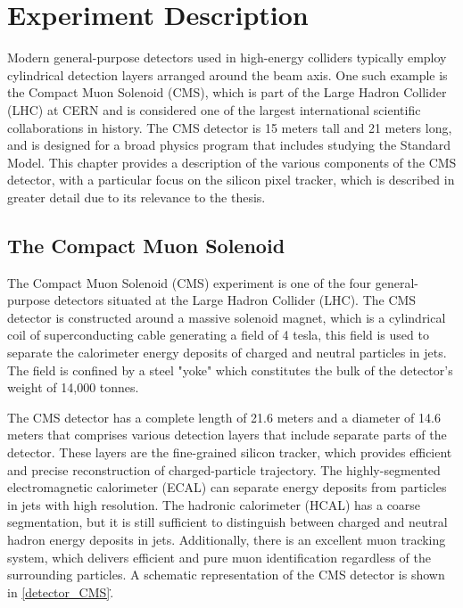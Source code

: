 \chapter{Experiment Description }

Modern general-purpose detectors used in high-energy colliders typically employ cylindrical detection layers arranged around the beam axis. One such example is the Compact Muon Solenoid (CMS), which is part of the Large Hadron Collider (LHC) at CERN and is considered one of the largest international scientific collaborations in history. The CMS detector is 15 meters tall and 21 meters long, and is designed for a broad physics program that includes studying the Standard Model. This chapter provides a description of the various components of the CMS detector, with a particular focus on the silicon pixel tracker, which is described in greater detail due to its relevance to the thesis.
 

\section{The Compact Muon Solenoid}

The Compact Muon Solenoid (CMS) experiment is one of the four general-purpose detectors situated at the Large Hadron Collider (LHC). The CMS detector is constructed around a massive solenoid magnet, which is a cylindrical coil of superconducting cable generating a field of 4 tesla, this field is used to separate the calorimeter energy deposits of charged and neutral particles in jets. The field is confined by a steel "yoke" which constitutes the bulk of the detector's weight of 14,000 tonnes. 

The CMS detector has a complete length of 21.6 meters and a diameter of 14.6 meters that  comprises various detection layers that include separate parts of the detector. These layers are the fine-grained silicon tracker, which provides efficient and precise reconstruction of charged-particle trajectory. The highly-segmented electromagnetic calorimeter (ECAL) can separate energy deposits from particles in jets with high resolution. The hadronic calorimeter (HCAL) has a coarse segmentation, but it is still sufficient to distinguish between charged and neutral hadron energy deposits in jets. Additionally, there is an excellent muon tracking system, which delivers efficient and pure muon identification regardless of the surrounding particles. A schematic representation of the CMS detector is shown in \ref{detector_CMS}.\.

